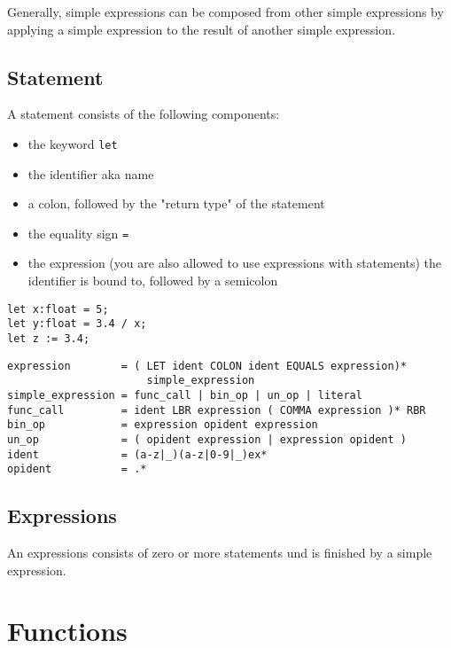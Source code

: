 \documentclass{scrartcl}
\begin{document}
\medskip

Generally, simple expressions can be composed from other simple expressions by applying a simple expression to the result of another simple expression.

\subsection{Statement}

A statement consists of the following components:

\begin{itemize}
    \item the keyword \texttt{let}
    \item the identifier aka name
    \item a colon, followed by the "return type" of the statement
    \item the equality sign \texttt{=}
    \item the expression (you are also allowed to use expressions with statements) the identifier is bound to, followed by a semicolon
\end{itemize}

\begin{lstlisting}
let x:float = 5;
let y:float = 3.4 / x;
let z := 3.4;
\end{lstlisting}

\begin{lstlisting}
expression        = ( LET ident COLON ident EQUALS expression)*
                      simple_expression
simple_expression = func_call | bin_op | un_op | literal
func_call         = ident LBR expression ( COMMA expression )* RBR
bin_op            = expression opident expression
un_op             = ( opident expression | expression opident )
ident             = (a-z|_)(a-z|0-9|_)ex*
opident           = .*
\end{lstlisting}

\subsection{Expressions}
An expressions consists of zero or more statements und is finished by a simple expression.

\section{Functions}
\end{document}
